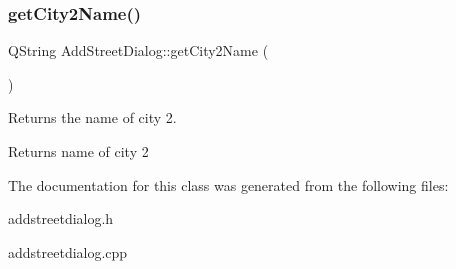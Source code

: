 \subsubsection{\texorpdfstring{get\+City2\+Name()}{getCity2Name()}}
{\footnotesize\ttfamily Q\+String Add\+Street\+Dialog\+::get\+City2\+Name (\begin{DoxyParamCaption}{ }\end{DoxyParamCaption})}



Returns the name of city 2. 

\begin{DoxyReturn}{Returns}
name of city 2 
\end{DoxyReturn}


The documentation for this class was generated from the following files\+:\begin{DoxyCompactItemize}
\item 
addstreetdialog.\+h\item 
addstreetdialog.\+cpp\end{DoxyCompactItemize}
